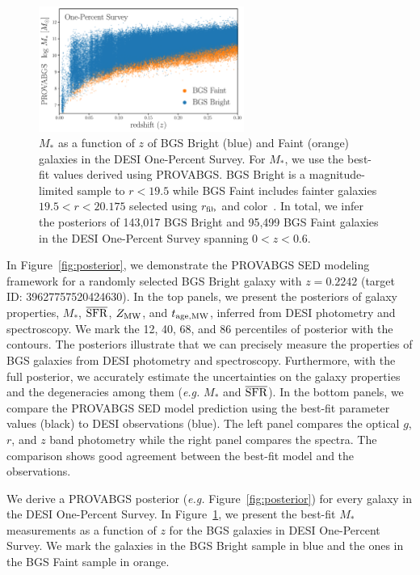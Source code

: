 \begin{figure}
\begin{center}
    \includegraphics[width=0.6\textwidth]{figs/mstar_z.pdf}
    \caption{
        $M_*$ as a function of $z$ of BGS Bright (blue) and Faint (orange)
        galaxies in the DESI One-Percent Survey. 
        For $M_*$, we use the best-fit values derived using PROVABGS. 
        BGS Bright is a magnitude-limited sample to $r < 19.5$ while BGS Faint
        includes fainter galaxies $19.5 < r < 20.175$ selected using $r_{\rm
        fib}$ and color~\citep{hahn2022c}. 
        In total, we infer the posteriors of 143,017 BGS Bright and 95,499 BGS
        Faint galaxies in the DESI One-Percent Survey spanning $0 < z < 0.6$. 
    }\label{fig:mstar_z}
\end{center}
\end{figure}


In Figure~\ref{fig:posterior}, we demonstrate the PROVABGS SED modeling
framework for a randomly selected BGS Bright galaxy with $z=0.2242$ 
(target ID: 39627757520424630).
In the top panels, we present the posteriors of galaxy properties, $M_*$, 
$\overline{\rm SFR}$, $Z_{\rm MW}$, and $t_{\rm age, MW}$, inferred from DESI
photometry and spectroscopy. 
We mark the 12, 40, 68, and 86 percentiles of posterior with the contours. 
The posteriors illustrate that we can precisely measure the properties of BGS
galaxies from DESI photometry and spectroscopy. 
Furthermore, with the full posterior, we accurately estimate the uncertainties
on the galaxy properties and the degeneracies among them (\emph{e.g.} $M_*$ and
$\overline{\rm SFR}$). 
In the bottom panels, we compare the PROVABGS SED model prediction using the
best-fit parameter values (black) to DESI observations (blue). 
The left panel compares the optical $g$, $r$, and $z$ band photometry while the
right panel compares the spectra. 
The comparison shows good agreement between the best-fit model and the
observations. 

We derive a PROVABGS posterior (\emph{e.g.} Figure~\ref{fig:posterior}) for
every galaxy in the DESI One-Percent Survey. 
In Figure~\ref{fig:mstar_z}, we present the best-fit $M_*$ measurements as a
function of $z$ for the BGS galaxies in DESI One-Percent Survey. 
We mark the galaxies in the BGS Bright sample in blue and the ones in the BGS
Faint sample in orange. 
